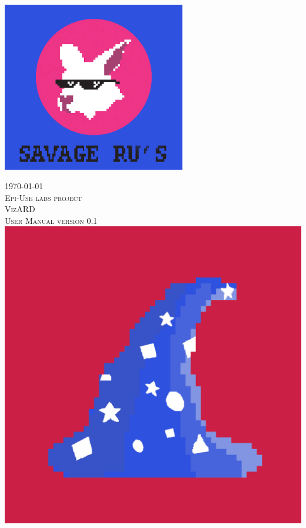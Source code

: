 \documentclass[a4paper,12pt]{article}
\begin{document}
\begin{titlepage}
\begin{minipage}{0.4\textwidth}
\begin{flushright}
\end{flushright}

\end{minipage}\\[0.5cm]



\centering
	\includegraphics[width=80mm]{SavageRu.jpg}

{\large \today}\\[3cm] %

\centering
	\textsc{\LARGE Epi-Use labs project}\\[0.5cm]
	\textsc{\Large VizARD}\\[0.5cm]
	\textsc{\Large User Manual version 0.1}\\[0.5cm]
	\includegraphics[width=\textwidth]{images/vizard.jpg}

\vfill %

\end{titlepage}
\end{document}
